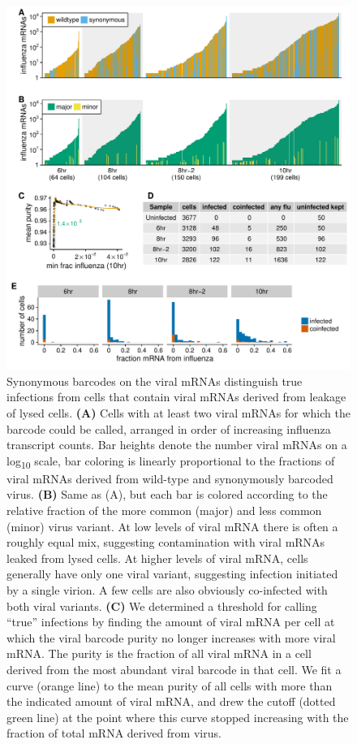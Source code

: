 \documentclass[9pt,lineno]{elife}
\begin{document}
\begin{figure}[t!]
\centerline{\includegraphics[width=0.83\linewidth]{figures/p_frac_flu_summary.pdf}}
\caption{\label{fig:viralbarcodes}
Synonymous barcodes on the viral mRNAs distinguish true infections from cells that contain viral mRNAs derived from leakage of lysed cells.
{\bf (A)}
Cells with at least two viral mRNAs for which the barcode could be called, arranged in order of increasing influenza transcript counts.
Bar heights denote the number viral mRNAs on a log\textsubscript{10} scale, bar coloring is linearly proportional to the fractions of viral mRNAs derived from wild-type and synonymously barcoded virus.
{\bf (B)}
Same as (A), but each bar is colored according to the relative fraction of the more common (major) and less common (minor) virus variant.
At low levels of viral mRNA there is often a roughly equal mix, suggesting contamination with viral mRNAs leaked from lysed cells.
At higher levels of viral mRNA, cells generally have only one viral variant, suggesting infection initiated by a single virion.
A few cells are also obviously co-infected with both viral variants.
{\bf (C)}
We determined a threshold for calling ``true'' infections by finding the amount of viral mRNA per cell at which the viral barcode purity no longer increases with more viral mRNA.
The purity is the fraction of all viral mRNA in a cell derived from the most abundant viral barcode in that cell.
We fit a curve (orange line) to the mean purity of all cells with more than the indicated amount of viral mRNA, and drew the cutoff (dotted green line) at the point where this curve stopped increasing with the fraction of total mRNA derived from virus.
}
\end{figure}
\end{document}
